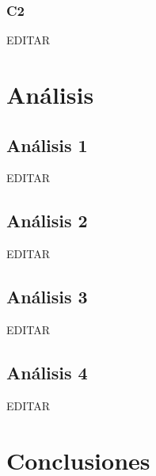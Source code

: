 \documentclass[preprint,12pt]{elsarticle}
\begin{document}
\subsubsection{\textbf{C2}}

EDITAR\\


 



\section{Análisis}

\subsection{\textbf{Análisis 1}}
EDITAR\\

\subsection{\textbf{Análisis 2}}
EDITAR\\

\subsection{\textbf{Análisis 3}}
EDITAR\\

\subsection{\textbf{Análisis 4}}
EDITAR\\




\section{Conclusiones}
\end{document}

